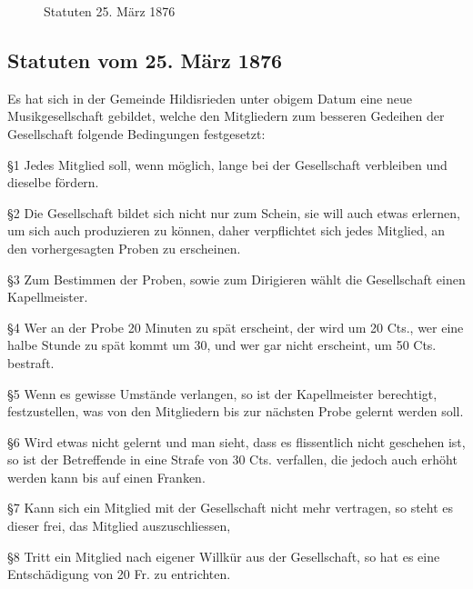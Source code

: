 
\begin{figure}[ht]
    \centering
    \hfil
    \caption{Statuten 25. März 1876}
    \label{fig:Statuten-1874}
\end{figure}

\subsection*{Statuten vom 25. März 1876}

\begin{history}


    Es hat sich in der Gemeinde Hildisrieden unter obigem Datum eine neue
    Musikgesellschaft gebildet, welche den Mitgliedern zum besseren Gedeihen der
    Gesellschaft folgende Bedingungen festgesetzt:

    \S1 Jedes Mitglied soll, wenn möglich, lange bei der Gesellschaft verbleiben
    und dieselbe fördern.

    \S2 Die Gesellschaft bildet sich nicht nur zum Schein, sie will auch etwas
    erlernen, um sich auch produzieren zu können, daher verpflichtet sich jedes
    Mitglied, an den vorhergesagten Proben zu erscheinen.

    \S3 Zum Bestimmen der Proben, sowie zum Dirigieren wählt die Gesellschaft
    einen Kapellmeister.

    \S4 Wer an der Probe 20 Minuten zu spät erscheint, der wird um 20 Cts., wer
    eine halbe Stunde zu spät kommt um 30, und wer gar nicht erscheint, um 50
    Cts. bestraft.

    \S5 Wenn es gewisse Umstände verlangen, so ist der Kapellmeister berechtigt,
    festzustellen, was von den Mitgliedern bis zur nächsten Probe gelernt werden
    soll.

    \S6 Wird etwas nicht gelernt und man sieht, dass es flissentlich nicht
    geschehen ist, so ist der Betreffende in eine Strafe von 30 Cts. verfallen,
    die jedoch auch erhöht werden kann bis auf einen Franken.

    \S7 Kann sich ein Mitglied mit der Gesellschaft nicht mehr vertragen, so
    steht es dieser frei, das Mitglied auszuschliessen,

    \S8 Tritt ein Mitglied nach eigener Willkür aus der Gesellschaft, so hat es
    eine Entschädigung von 20 Fr. zu entrichten.


\end{history}
